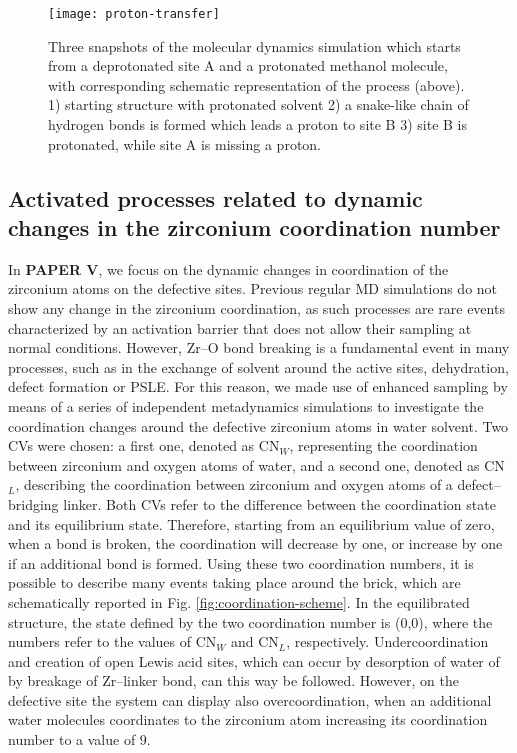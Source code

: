 \begin{figure}[!htbp]
	\centering
	\texttt{[image: proton-transfer]}
	\caption{Three snapshots of the molecular dynamics simulation which starts from a deprotonated site A and a protonated methanol molecule, with corresponding schematic representation of the process (above). 1) starting structure with protonated solvent 2) a snake-like chain of hydrogen bonds is formed which leads a proton to site B 3) site B is protonated, while site A is missing a proton.}
	\label{fig:proton-transfer}
\end{figure}

\subsection{Activated processes related to dynamic changes in the zirconium coordination number}
In \textbf{PAPER V}, we focus on the dynamic changes in coordination of the zirconium atoms on the defective sites. Previous regular MD simulations do not show any change in the zirconium coordination, as such processes are rare events characterized by an activation barrier that does not allow their sampling at normal conditions. However, Zr--O bond breaking is a fundamental event in many processes, such as in the exchange of solvent around the active sites, dehydration, defect formation or PSLE. For this reason, we made use of enhanced sampling by means of a series of independent metadynamics simulations to investigate the coordination changes around the defective zirconium atoms in water solvent. Two CVs were chosen: a first one, denoted as CN$_W$, representing the coordination between zirconium and oxygen atoms of water, and a second one, denoted as CN$_L$, describing the coordination between zirconium and oxygen atoms of a defect--bridging linker. Both CVs refer to the difference between the coordination state and its equilibrium state. Therefore, starting from an equilibrium value of zero, when a bond is broken, the coordination will decrease by one, or increase by one if an additional bond is formed. Using these two coordination numbers, it is possible to describe many events taking place around the brick, which are schematically reported in Fig. \ref{fig:coordination-scheme}. In the equilibrated structure, the state defined by the two coordination number is (0,0), where the numbers refer to the values of CN$_W$ and CN$_L$, respectively. Undercoordination and creation of open Lewis acid sites, which can occur by desorption of water of by breakage of Zr--linker bond, can this way be followed. However, on the defective site the system can display also overcoordination, when an additional water molecules coordinates to the zirconium atom increasing its coordination number to a value of 9. 

